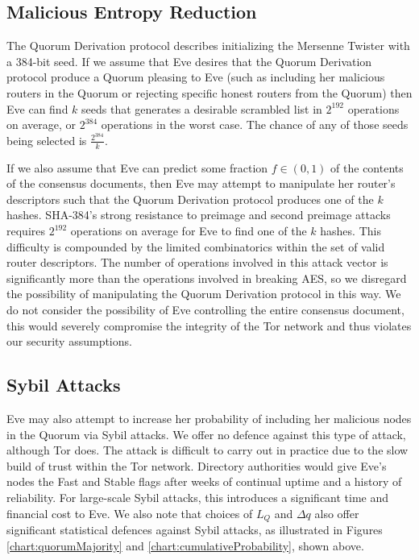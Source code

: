 \documentclass{sig-alternate}
\begin{document}
\subsection{Malicious Entropy Reduction}

The Quorum Derivation protocol describes initializing the Mersenne Twister with a 384-bit seed. If we assume that Eve desires that the Quorum Derivation protocol produce a Quorum pleasing to Eve (such as including her malicious routers in the Quorum or rejecting specific honest routers from the Quorum) then Eve can find $ k $ seeds that generates a desirable scrambled list in $ 2^{192} $ operations on average, or $ 2^{384} $ operations in the worst case. The chance of any of those seeds being selected is $ \frac{2^{384}}{k} $. 

If we also assume that Eve can predict some fraction $ f \in {(0, 1)} $ of the contents of the consensus documents, then Eve may attempt to manipulate her router's descriptors such that the Quorum Derivation protocol produces one of the $ k $ hashes. SHA-384's strong resistance to preimage and second preimage attacks requires $ 2^{192} $ operations on average for Eve to find one of the $ k $ hashes. This difficulty is compounded by the limited combinatorics within the set of valid router descriptors. The number of operations involved in this attack vector is significantly more than the operations involved in breaking AES, so we disregard the possibility of manipulating the Quorum Derivation protocol in this way. We do not consider the possibility of Eve controlling the entire consensus document, this would severely compromise the integrity of the Tor network and thus violates our security assumptions.

\subsection{Sybil Attacks}

Eve may also attempt to increase her probability of including her malicious nodes in the Quorum via Sybil attacks. We offer no defence against this type of attack, although Tor does. The attack is difficult to carry out in practice due to the slow build of trust within the Tor network. Directory authorities would give Eve's nodes the Fast and Stable flags after weeks of continual uptime and a history of reliability. For large-scale Sybil attacks, this introduces a significant time and financial cost to Eve. We also note that choices of $ L_{Q} $ and $ \Delta q $ also offer significant statistical defences against Sybil attacks, as illustrated in Figures  \ref{chart:quorumMajority} and \ref{chart:cumulativeProbability}, shown above.
\end{document}

